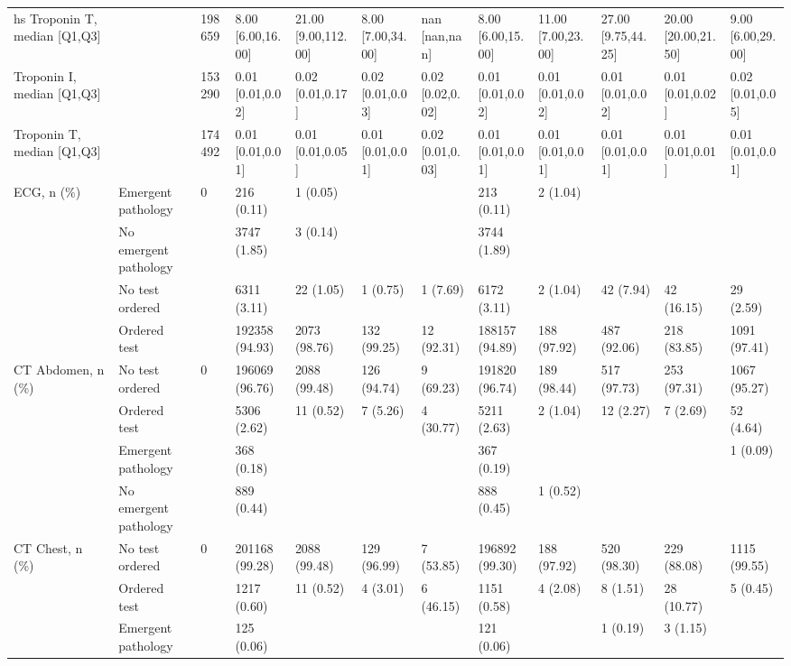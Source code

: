 \begin{tabular}{llllllllllll}
\cline{1-12}
hs Troponin T, median [Q1,Q3] &  & 198659 & 8.00 [6.00,16.00] & 21.00 [9.00,112.00] & 8.00 [7.00,34.00] & nan [nan,nan] & 8.00 [6.00,15.00] & 11.00 [7.00,23.00] & 27.00 [9.75,44.25] & 20.00 [20.00,21.50] & 9.00 [6.00,29.00] \\
\cline{1-12}
Troponin I, median [Q1,Q3] &  & 153290 & 0.01 [0.01,0.02] & 0.02 [0.01,0.17] & 0.02 [0.01,0.03] & 0.02 [0.02,0.02] & 0.01 [0.01,0.02] & 0.01 [0.01,0.02] & 0.01 [0.01,0.02] & 0.01 [0.01,0.02] & 0.02 [0.01,0.05] \\
\cline{1-12}
Troponin T, median [Q1,Q3] &  & 174492 & 0.01 [0.01,0.01] & 0.01 [0.01,0.05] & 0.01 [0.01,0.01] & 0.02 [0.01,0.03] & 0.01 [0.01,0.01] & 0.01 [0.01,0.01] & 0.01 [0.01,0.01] & 0.01 [0.01,0.01] & 0.01 [0.01,0.01] \\
\cline{1-12}
\multirow[t]{4}{*}{ECG, n (\%)} & Emergent pathology & 0 & 216 (0.11) & 1 (0.05) &  &  & 213 (0.11) & 2 (1.04) &  &  &  \\
 & No emergent pathology &  & 3747 (1.85) & 3 (0.14) &  &  & 3744 (1.89) &  &  &  &  \\
 & No test ordered &  & 6311 (3.11) & 22 (1.05) & 1 (0.75) & 1 (7.69) & 6172 (3.11) & 2 (1.04) & 42 (7.94) & 42 (16.15) & 29 (2.59) \\
 & Ordered test &  & 192358 (94.93) & 2073 (98.76) & 132 (99.25) & 12 (92.31) & 188157 (94.89) & 188 (97.92) & 487 (92.06) & 218 (83.85) & 1091 (97.41) \\
\cline{1-12}
\multirow[t]{4}{*}{CT Abdomen, n (\%)} & No test ordered & 0 & 196069 (96.76) & 2088 (99.48) & 126 (94.74) & 9 (69.23) & 191820 (96.74) & 189 (98.44) & 517 (97.73) & 253 (97.31) & 1067 (95.27) \\
 & Ordered test &  & 5306 (2.62) & 11 (0.52) & 7 (5.26) & 4 (30.77) & 5211 (2.63) & 2 (1.04) & 12 (2.27) & 7 (2.69) & 52 (4.64) \\
 & Emergent pathology &  & 368 (0.18) &  &  &  & 367 (0.19) &  &  &  & 1 (0.09) \\
 & No emergent pathology &  & 889 (0.44) &  &  &  & 888 (0.45) & 1 (0.52) &  &  &  \\
\cline{1-12}
\multirow[t]{4}{*}{CT Chest, n (\%)} & No test ordered & 0 & 201168 (99.28) & 2088 (99.48) & 129 (96.99) & 7 (53.85) & 196892 (99.30) & 188 (97.92) & 520 (98.30) & 229 (88.08) & 1115 (99.55) \\
 & Ordered test &  & 1217 (0.60) & 11 (0.52) & 4 (3.01) & 6 (46.15) & 1151 (0.58) & 4 (2.08) & 8 (1.51) & 28 (10.77) & 5 (0.45) \\
 & Emergent pathology &  & 125 (0.06) &  &  &  & 121 (0.06) &  & 1 (0.19) & 3 (1.15) &  \\

\end{tabular}
